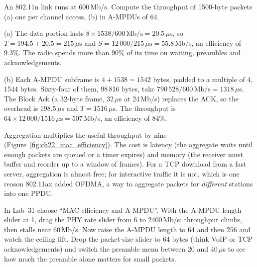 \begin{worked}
An 802.11n link runs at 600\,Mb/s. Compute the throughput of 1500-byte packets (a) one per channel
access, (b) in A-MPDUs of 64.

(a) The data portion lasts $8\times1538/600\,\text{Mb/s}=20.5\,\mu$s, so $T=194.5+20.5=215\,\mu$s and
$S=12\,000/215\,\mu\text{s}=55.8$\,Mb/s, an efficiency of 9.3\%. The radio spends more than 90\% of
its time on waiting, preambles and acknowledgements.

(b) Each A-MPDU subframe is $4+1538=1542$ bytes, padded to a multiple of 4, 1544 bytes. Sixty-four
of them, 98\,816 bytes, take $790\,528/600\,\text{Mb/s}=1318\,\mu$s. The Block Ack (a 32-byte frame,
32\,$\mu$s at 24\,Mb/s) replaces the ACK, so the overhead is $198.5\,\mu$s and $T=1516\,\mu$s. The
throughput is $64\times12\,000/1516\,\mu\text{s}=507$\,Mb/s, an efficiency of 84\%.

Aggregation multiplies the useful throughput by nine (Figure~\ref{fig:ch22_mac_efficiency}). The cost is latency (the aggregate waits until
enough packets are queued or a timer expires) and memory (the receiver must buffer and reorder up to
a window of frames). For a TCP download from a fast server, aggregation is almost free; for
interactive traffic it is not, which is one reason 802.11ax added OFDMA, a way to aggregate packets
for \emph{different} stations into one PPDU.
\end{worked}


\begin{tryit}
In Lab~31 choose ``MAC efficiency and A-MPDU''. With the A-MPDU length slider at 1, drag the PHY
rate slider from 6 to 2400\,Mb/s: throughput climbs, then stalls near 60\,Mb/s. Now raise the
A-MPDU length to 64 and then 256 and watch the ceiling lift. Drop the packet-size slider to 64 bytes
(think VoIP or TCP acknowledgements) and switch the preamble menu between 20 and 40\,$\mu$s to see
how much the preamble alone matters for small packets.
\end{tryit}

